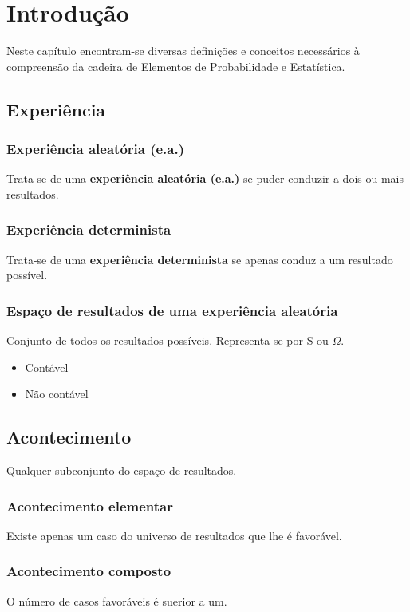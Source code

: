 \chapter{Introdução}
Neste capítulo encontram-se diversas definições e conceitos necessários à compreensão da cadeira de Elementos de Probabilidade e Estatística.

\section{Experiência}

\subsection{Experiência aleatória (e.a.)}
Trata-se de uma \textbf{experiência aleatória (e.a.)} se puder conduzir a dois ou mais resultados.

\subsection{Experiência determinista}
Trata-se de uma \textbf{experiência determinista} se apenas conduz a um resultado possível.

\subsection{Espaço de resultados de uma experiência aleatória}
Conjunto de todos os resultados possíveis.
Representa-se por S ou $\Omega$.
\begin{itemize}
    \item Contável
    \item Não contável
\end{itemize}

\section{Acontecimento}
Qualquer subconjunto do espaço de resultados.

\subsection{Acontecimento elementar}
Existe apenas um caso do universo de resultados que lhe é favorável.

\subsection{Acontecimento composto}
O número de casos favoráveis é suerior a um.

